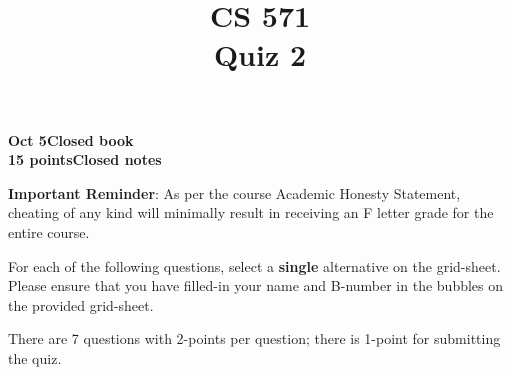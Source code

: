 \documentclass[12pt]{article}
\title{CS 571\\Quiz 2}
\date{}
\begin{document}
\maketitle

\begin{flushleft}
\textbf{Oct 5}\hfill\textbf{Closed book}\\
\textbf{15 points}\hfill\textbf{Closed notes}\\

\vspace{0.5cm}

\textbf{Important Reminder}: As per the course Academic Honesty
Statement, cheating of any kind will minimally result in receiving an
F letter grade for the entire course.


\end{flushleft}

For each of the following questions, select a \textbf{single}
alternative on the grid-sheet.  Please ensure that you have filled-in
your name and B-number in the bubbles on the provided grid-sheet.

There are 7 questions with 2-points per question; there is 1-point
for submitting the quiz.
\end{document}
